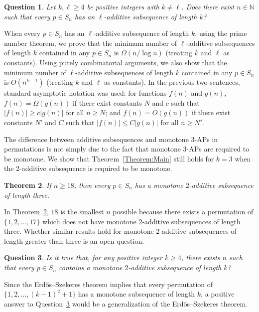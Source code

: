 \documentclass[10pt,a4paper]{amsart}
\newtheorem{theorem}{Theorem}[section]
\newtheorem{problem}[theorem]{Question}
\begin{document}
\begin{problem}\label{Problem:l-Additive}
    Let $k,\ell\geq4$ be positive integers with $k\neq\ell$. Does there exist $n\in\mathbb{N}$ such that every $p\in S_n$ has an $\ell$-additive subsequence of length $k$?
\end{problem}
When every $p\in S_n$ has an $\ell$-additive subsequence of length $k$, using the prime number theorem, we prove that the minimum number of $\ell$-additive subsequences of length $k$ contained in any $p\in S_n$ is $\Omega(n/\log n)$ (treating $k$ and $\ell$ as constants). Using purely combinatorial arguments, we also show that the minimum number of $\ell$-additive subsequences of length $k$ contained in any $p\in S_n$ is $O(n^{k-1})$ (treating $k$ and $\ell$ as constants). In the previous two sentences, standard asymptotic notation was used: for functions $f(n)$ and $g(n)$, $f(n)=\Omega(g(n))$ if there exist constants $N$ and $c$ such that $|f(n)|\geq c|g(n)|$ for all $n\geq N$; and $f(n)=O(g(n))$ if there exist constants $N'$ and $C$ such that $|f(n)|\leq C|g(n)|$ for all $n\geq N'$.

The difference between additive subsequences and monotone 3-APs in permutations is not simply due to the fact that monotone 3-APs are required to be monotone. We show that Theorem~\ref{Theorem:Main} still holds for $k=3$ when the $2$-additive subsequence is required to be monotone.
\begin{theorem}\label{Theorem:Mon}
    If $n\geq 18$, then every $p\in S_n$ has a monotone $2$-additive subsequence of length three.
\end{theorem}
In Theorem~\ref{Theorem:Mon}, $18$ is the smallest $n$ possible because there exists a permutation of $\{1,2,\ldots,17\}$ which does not have monotone $2$-additive subsequences of length three. Whether similar results hold for monotone $2$-additive subsequences of length greater than three is an open question. 

\begin{problem}\label{Problem:Mon}
Is it true that, for any positive integer $k\geq4$, there exists $n$ such that every $p\in S_n$ contains a monotone $2$-additive subsequence of length $k$?
\end{problem}


Since the Erd\H{o}s–Szekeres theorem \cite{ErdosSzekeres1935} implies that every permutation of $\{1,2,\ldots,(k-1)^2+1\}$ has a monotone subsequence of length $k$, a positive answer to Question~\ref{Problem:Mon} would be a generalization of the Erd\H{o}s–Szekeres theorem.
\end{document}
